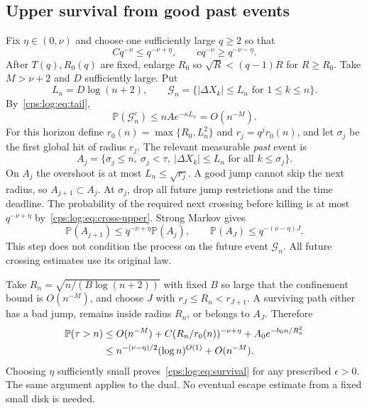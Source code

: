 \documentclass[11pt,letterpaper]{article}
\numberwithin{equation}{section}
\theoremstyle{remark}\newtheorem{remark}[theorem]{Remark}
\newcommand{\PP}{\mathbb P}
\begin{document}
\subsection{Upper survival from good past events}\label{cps:log:sec:upper}
Fix $\eta\in(0,\nu)$ and choose one sufficiently large $q\ge2$ so that
\begin{equation}\label{cps:log:eq:chooseq}
 Cq^{-\nu}\le q^{-\nu+\eta},\qquad
 cq^{-\nu}\ge q^{-\nu-\eta}.
\end{equation}
After $T(q),R_0(q)$ are fixed, enlarge $R_0$ so
$\sqrt R<(q-1)R$ for $R\ge R_0$.
Take $M>\nu+2$ and $D$ sufficiently large. Put
\[
 L_n=D\log(n+2),\qquad
 \mathcal G_n=\{|\Delta X_k|\le L_n\text{ for }1\le k\le n\}.
\]
By~\eqref{cps:log:eq:tail},
\begin{equation}\label{cps:log:eq:badjump}
 \PP(\mathcal G_n^c)\le nAe^{-\kappa L_n}=O(n^{-M}).
\end{equation}
For this horizon define
$r_0(n)=\max\{R_0,L_n^2\}$ and $r_j=q^jr_0(n)$, and let $\sigma_j$
be the first global hit of radius $r_j$. The relevant measurable
\emph{past} event is
\[
 A_j=\{\sigma_j\le n,\ \sigma_j<\tau,
             \ |\Delta X_k|\le L_n\text{ for all }k\le\sigma_j\}.
\]
On $A_j$ the overshoot is at most $L_n\le\sqrt{r_j}$.
A good jump cannot skip the next radius, so $A_{j+1}\subset A_j$.
At $\sigma_j$, drop all future jump restrictions and the time deadline.
The probability of the required next crossing before killing is at
most $q^{-\nu+\eta}$ by~\eqref{cps:log:eq:cross-upper}. Strong Markov gives
\begin{equation}\label{cps:log:eq:annularupper}
 \PP(A_{j+1})\le q^{-\nu+\eta}\PP(A_j),\qquad
 \PP(A_J)\le q^{-(\nu-\eta)J}.
\end{equation}
This step does not condition the process on the future event
$\mathcal G_n$. All future crossing estimates use its original law.

Take $R_n=\sqrt{n/(B\log(n+2))}$ with fixed $B$ so large that the
confinement bound is $O(n^{-M})$, and choose $J$ with
$r_J\le R_n<r_{J+1}$. A surviving path either has a bad jump, remains
inside radius $R_n$, or belongs to $A_J$. Therefore
\begin{align}
 \PP(\tau>n)
 &\le O(n^{-M})+C(R_n/r_0(n))^{-\nu+\eta}
                  +A_0e^{-b_0n/R_n^2}\notag\\
 &\le n^{-(\nu-\eta)/2}(\log n)^{O(1)}+O(n^{-M}).\label{cps:log:eq:survival-proof}
\end{align}
Choosing $\eta$ sufficiently small proves~\eqref{cps:log:eq:survival} for
any prescribed $\epsilon>0$. The same argument applies to the dual.
No eventual escape estimate from a fixed small disk is needed.
\end{document}
